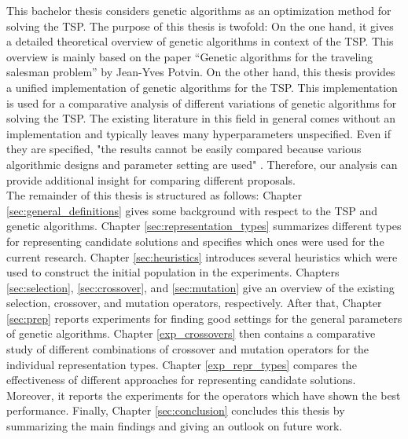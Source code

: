 This bachelor thesis considers genetic algorithms as an optimization method for solving the TSP. The purpose of this thesis is twofold: On the one hand, it gives a detailed theoretical overview of genetic algorithms in context of the TSP. This overview is mainly based on the paper “Genetic algorithms for the traveling salesman problem” \cite{potvin1996genetic} by Jean-Yves Potvin. On the other hand, this thesis provides a unified implementation of genetic algorithms for the TSP. This implementation is used for a comparative analysis of different variations of genetic algorithms for solving the TSP. The existing literature in this field in general comes without an implementation and typically leaves many hyperparameters unspecified. Even if they are specified, "the results cannot be easily compared because various algorithmic designs and parameter setting are used" \cite{potvin1996genetic}. Therefore, our analysis can provide additional insight for comparing different \mbox{proposals}.\\ 

The remainder of this thesis is structured as follows: Chapter \ref{sec:general_definitions} gives some background with respect to the TSP and genetic algorithms. Chapter \ref{sec:representation_types} summarizes different types for representing candidate solutions and specifies which ones were used for the current research. Chapter \ref{sec:heuristics} introduces several heuristics which were used to construct the initial population in the experiments. Chapters \ref{sec:selection}, \ref{sec:crossover}, and \ref{sec:mutation} give an overview of the existing selection, crossover, and mutation operators, respectively. After that, Chapter \ref{sec:prep} reports experiments for finding good settings for the general parameters of genetic algorithms. Chapter \ref{exp_crossovers} then contains a comparative study of different combinations of crossover and mutation operators for the individual representation types. Chapter \ref{exp_repr_types} compares the effectiveness of different approaches for representing candidate solutions. Moreover, it reports the experiments for the operators which have shown the best performance. Finally, Chapter \ref{sec:conclusion} concludes this thesis by summarizing the main findings and giving an outlook on future work.\par
